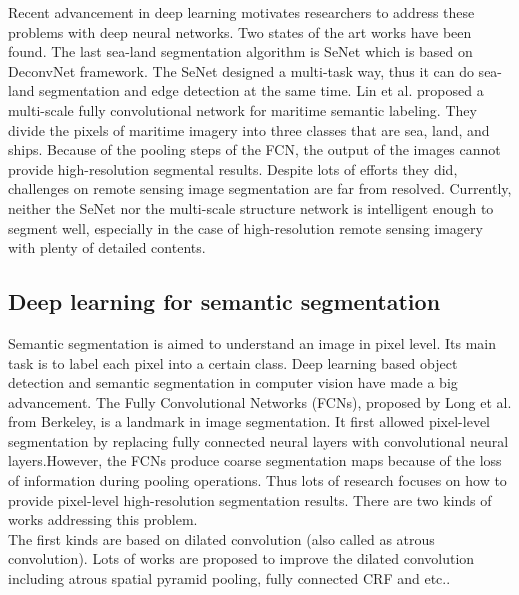 \documentclass[conference]{IEEEtran}
\begin{document}
Recent advancement in deep learning motivates researchers to address these problems with deep neural networks.  Two states of the art works have been found. The last sea-land segmentation algorithm is SeNet\cite{b3} which is based on DeconvNet framework. The SeNet designed a multi-task way, thus it can do sea-land segmentation and edge detection at the same time.  Lin et al.\cite{b14} proposed a multi-scale fully convolutional network for maritime semantic labeling. They divide the pixels of maritime imagery into three classes that are sea, land, and ships. Because of the pooling steps of the FCN, the output of the images cannot provide high-resolution segmental results.  Despite lots of efforts they did, challenges on remote sensing image segmentation are far from resolved.  Currently, neither the SeNet nor the multi-scale structure network is intelligent enough to segment well, especially in the case of high-resolution remote sensing imagery with plenty of detailed contents.\\

\subsection{Deep learning for semantic segmentation}

Semantic segmentation is aimed to understand an image in pixel level. Its main task is to label each pixel into a certain class.  Deep learning based object detection and semantic segmentation in computer vision have made a big advancement. The Fully Convolutional Networks (FCNs)\cite{b15}, proposed by Long et al. from Berkeley, is a landmark in image segmentation. It first allowed pixel-level segmentation by replacing fully connected neural layers with convolutional neural layers.However, the FCNs produce coarse segmentation maps because of the loss of information during pooling operations. Thus lots of research focuses on how to provide pixel-level high-resolution segmentation results. There are two kinds of works addressing this problem.\\

The first kinds are based on dilated convolution\cite{b16} (also called as atrous convolution). Lots of works are proposed to improve the dilated convolution including atrous spatial pyramid pooling\cite{b17}, fully connected CRF\cite{b18} and etc..\\
\end{document}
